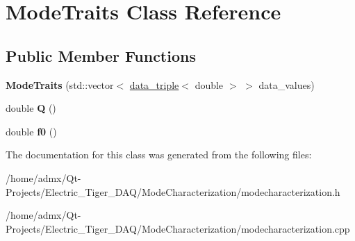 \hypertarget{class_mode_traits}{\section{Mode\+Traits Class Reference}
\label{class_mode_traits}
}
\subsection*{Public Member Functions}
\begin{DoxyCompactItemize}
\item 
\hypertarget{class_mode_traits_a692c4e3ef4bed868feb77392e0d23673}{{\bfseries Mode\+Traits} (std\+::vector$<$ \hyperlink{structdata__triple}{data\+\_\+triple}$<$ double $>$ $>$ data\+\_\+values)}\label{class_mode_traits_a692c4e3ef4bed868feb77392e0d23673}

\item 
\hypertarget{class_mode_traits_a83b44ff9b0e9db253c7cd13b1e51a736}{double {\bfseries Q} ()}\label{class_mode_traits_a83b44ff9b0e9db253c7cd13b1e51a736}

\item 
\hypertarget{class_mode_traits_a903f06c1d611514e42869f6d6b1e387f}{double {\bfseries f0} ()}\label{class_mode_traits_a903f06c1d611514e42869f6d6b1e387f}

\end{DoxyCompactItemize}


The documentation for this class was generated from the following files\+:\begin{DoxyCompactItemize}
\item 
/home/admx/\+Qt-\/\+Projects/\+Electric\+\_\+\+Tiger\+\_\+\+D\+A\+Q/\+Mode\+Characterization/modecharacterization.\+h\item 
/home/admx/\+Qt-\/\+Projects/\+Electric\+\_\+\+Tiger\+\_\+\+D\+A\+Q/\+Mode\+Characterization/modecharacterization.\+cpp\end{DoxyCompactItemize}
